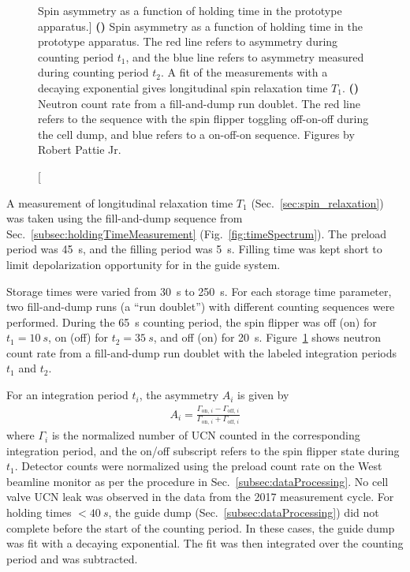 \begin{figure}
\begin{subfigure}{.5\textwidth}
  \caption{}\label{subfig:ramsey2017_t1_doublet}
\end{subfigure}
\caption
    [Spin asymmetry as a function of holding time in the prototype apparatus.]
    {\textbf{()} Spin asymmetry as a function of holding time in the prototype apparatus. The red line refers to asymmetry during counting period $t_1$, and the blue line refers to asymmetry measured during counting period $t_2$. A fit of the measurements with a decaying exponential gives longitudinal spin relaxation time $T_1$. \textbf{()} Neutron count rate from a fill-and-dump run doublet. The red line refers to the sequence with the spin flipper toggling off-on-off during the cell dump, and blue refers to a on-off-on sequence. Figures by Robert Pattie Jr.}
\label{fig:ramsey_2017_t1}
\end{figure}

A measurement of longitudinal relaxation time $T_1$ (Sec.~\ref{sec:spin_relaxation}) was taken using the fill-and-dump sequence from Sec.~\ref{subsec:holdingTimeMeasurement} (Fig.~\ref{fig:timeSpectrum}). The preload period was \qty{45}{\second}, and the filling period was \qty{5}{\second}. Filling time was kept short to limit depolarization opportunity for \ucn in the guide system.

Storage times were varied from \qty{30}{\second} to \qty{250}{\second}. For each storage time parameter, two fill-and-dump runs (a ``run doublet'') with different counting sequences were performed. During the \qty{65}{\second} counting period, the spin flipper was off (on) for $t_1=\qty{10}{s}$, on (off) for $t_2=\qty{35}{s}$, and off (on) for \qty{20}{\second}. Figure~\ref{subfig:ramsey2017_t1_doublet} shows neutron count rate from a fill-and-dump run doublet with the labeled integration periods $t_1$ and $t_2$.

For an integration period $t_i$, the asymmetry $A_i$ is given by
%
\begin{gather}
    A_i=\frac{\Gamma_{\text{on, }i}-\Gamma_{\text{off, }i}}{\Gamma_{\text{on, }i}+\Gamma_{\text{off, }i}}
    \label{eq:spin_asymmetry} 
\end{gather}
%
where $\Gamma_i$ is the normalized number of UCN counted in the corresponding integration period, and the on/off subscript refers to the spin flipper state during $t_1$. Detector counts were normalized using the preload count rate on the West beamline monitor as per the procedure in Sec.~\ref{subsec:dataProcessing}. No cell valve UCN leak was observed in the data from the 2017 measurement cycle. For holding times $<\qty{40}{s}$, the guide dump (Sec.~\ref{subsec:dataProcessing}) did not complete before the start of the counting period. In these cases, the guide dump was fit with a decaying exponential. The fit was then integrated over the counting period and was subtracted.

